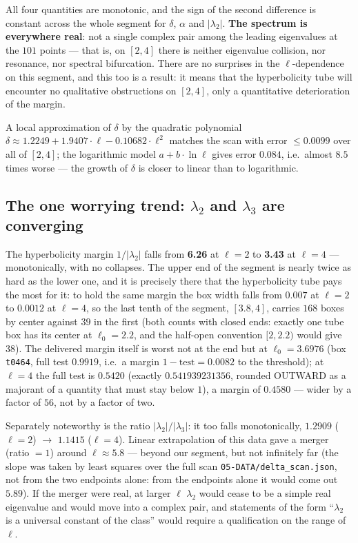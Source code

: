 All four quantities are monotonic, and the sign of the second difference is
constant across the whole segment for $\delta$, $\alpha$ and
$|\lambda_{2}|$. \textbf{The spectrum is everywhere real}: not
a single complex pair among the leading eigenvalues at the $101$ points --- that
is, on $[2,4]$ there is neither eigenvalue collision, nor resonance, nor
spectral bifurcation. There are no surprises in the $\ell$-dependence on this
segment, and this too is a result: it means that the hyperbolicity tube will
encounter no qualitative obstructions on $[2,4]$, only a quantitative
deterioration of the margin.

A local approximation of $\delta$ by the quadratic polynomial
$\delta \approx 1.2249 + 1.9407\cdot\ell - 0.10682\cdot\ell^{2}$ matches the scan with error $\le 0.0099$
over all of $[2,4]$; the logarithmic model $a + b\cdot\ln\ell$ gives error $0.084$,
i.e.\ almost $8.5$ times worse --- the growth of $\delta$ is closer to linear than to
logarithmic.


\subsection{The one worrying trend: $\lambda_{2}$ and $\lambda_{3}$ are converging}
\label{sec:7.4}

The hyperbolicity margin $1/|\lambda_{2}|$ falls from \textbf{6.26} at $\ell=2$ to \textbf{3.43} at
$\ell=4$ --- monotonically, with no collapses. The upper end of the segment is
nearly twice as hard as the lower one, and it is precisely there that the hyperbolicity tube pays the most for it: to hold the same margin the box width falls from $0.007$ at $\ell=2$ to $0.0012$ at $\ell=4$, so the last tenth of the segment, $[3.8,4]$, carries $168$ boxes by center against $39$ in the first (both counts with
closed ends: exactly one tube box has its center at $\ell_{0} = 2.2$, and
the half-open convention $[2, 2.2)$ would give $38$). The delivered margin itself is worst not at the end but at $\ell_{0}=3.6976$ (box \texttt{t0464}, full test $0.9919$, i.e.\ a margin $1-\text{test}=0.0082$ to the threshold); at $\ell=4$ the full test is $0.5420$ (exactly $0.541939231356$, rounded OUTWARD as a majorant of a quantity that must stay below $1$), a margin of $0.4580$ --- wider by a factor of $56$, not by a factor of two.

Separately noteworthy is the ratio $|\lambda_{2}|/|\lambda_{3}|$: it too falls monotonically,
$1.2909$ ($\ell=2$) $\to$ $1.1415$ ($\ell=4$). Linear extrapolation of this data gave a merger
(ratio $= 1$) around \textbf{$\ell \approx 5.8$} --- beyond our segment, but not infinitely far
(the slope was taken by least squares over the full scan
\texttt{05-\allowbreak DATA/\allowbreak delta\_\allowbreak scan.json}, not from the two endpoints alone: from the
endpoints alone it would come out $5.89$). If the merger were real, at larger
$\ell$ $\lambda_{2}$ would cease to be a simple real eigenvalue and would move into a
complex pair, and statements of the form ``$\lambda_{2}$ is a universal constant of the
class'' would require a qualification on the range of $\ell$.

